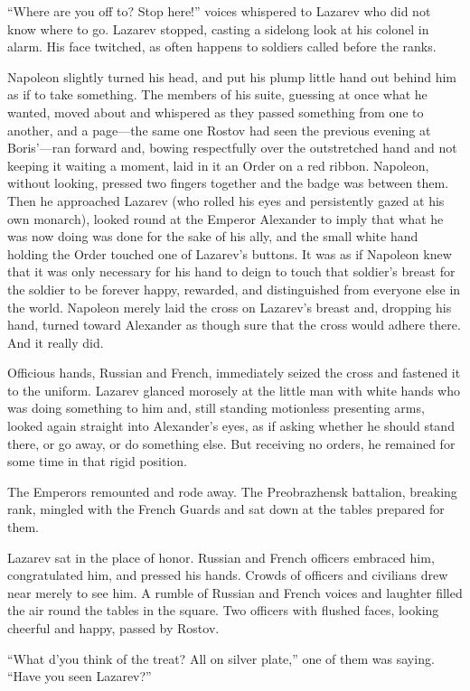 ``Where are you off to? Stop here!'' voices whispered to Lazarev
who did not know where to go. Lazarev stopped, casting a sidelong
look at his colonel in alarm. His face twitched, as often happens
to soldiers called before the ranks.

Napoleon slightly turned his head, and put his plump little hand
out behind him as if to take something. The members of his suite,
guessing at once what he wanted, moved about and whispered as
they passed something from one to another, and a page---the same
one Rostov had seen the previous evening at Boris'---ran forward
and, bowing respectfully over the outstretched hand and not
keeping it waiting a moment, laid in it an Order on a red
ribbon. Napoleon, without looking, pressed two fingers together
and the badge was between them. Then he approached Lazarev (who
rolled his eyes and persistently gazed at his own monarch),
looked round at the Emperor Alexander to imply that what he was
now doing was done for the sake of his ally, and the small white
hand holding the Order touched one of Lazarev's buttons. It was
as if Napoleon knew that it was only necessary for his hand to
deign to touch that soldier's breast for the soldier to be
forever happy, rewarded, and distinguished from everyone else in
the world. Napoleon merely laid the cross on Lazarev's breast
and, dropping his hand, turned toward Alexander as though sure
that the cross would adhere there. And it really did.

Officious hands, Russian and French, immediately seized the cross
and fastened it to the uniform. Lazarev glanced morosely at the
little man with white hands who was doing something to him and,
still standing motionless presenting arms, looked again straight
into Alexander's eyes, as if asking whether he should stand
there, or go away, or do something else. But receiving no orders,
he remained for some time in that rigid position.

The Emperors remounted and rode away. The Preobrazhensk
battalion, breaking rank, mingled with the French Guards and sat
down at the tables prepared for them.

Lazarev sat in the place of honor. Russian and French officers
embraced him, congratulated him, and pressed his hands. Crowds of
officers and civilians drew near merely to see him. A rumble of
Russian and French voices and laughter filled the air round the
tables in the square. Two officers with flushed faces, looking
cheerful and happy, passed by Rostov.

``What d'you think of the treat? All on silver plate,'' one of
them was saying. ``Have you seen Lazarev?''

